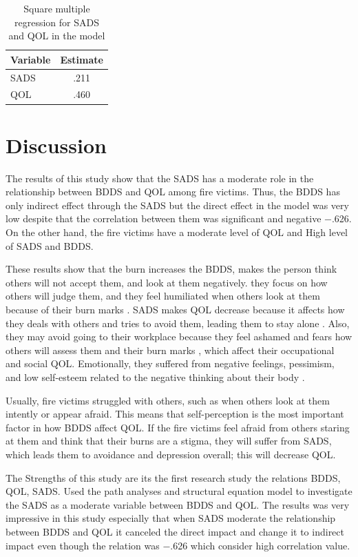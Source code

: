 \documentclass{NSP1}
\begin{document}
\begin{table}[!ht]
\centering
\caption{Square multiple regression for SADS and QOL in the model}
\label{tab:smr}
\begin{tabular}{lc}
\hline
Variable & Estimate \\
\hline
SADS & .211 \\
QOL  & .460 \\
\hline
\end{tabular}
\end{table}

\section{Discussion}
The results of this study show that the SADS has a moderate role in the relationship between BDDS and QOL among fire victims. Thus, the BDDS has only indirect effect through the SADS but the direct effect in the model was very low despite that the correlation between them was significant and negative $-$.626. On the other hand, the fire victims have a moderate level of QOL and High level of SADS and BDDS.

These results show that the burn increases the BDDS, makes the person think others will not accept them, and look at them negatively. they focus on how others will judge them, and they feel humiliated when others look at them because of their burn marks \cite{Suluhan2023}. SADS makes QOL decrease because it affects how they deals with others and tries to avoid them, leading them to stay alone \cite{Gorbani2021}. Also, they may avoid going to their workplace because they feel ashamed and fears how others will assess them and their burn marks \cite{Hussain2023}, which affect their occupational and social QOL. Emotionally, they suffered from negative feelings, pessimism, and low self-esteem related to the negative thinking about their body \cite{Yesilyurt2024}.

Usually, fire victims struggled with others, such as when others look at them intently or appear afraid. This means that self-perception is the most important factor in how BDDS affect QOL. If the fire victims feel afraid from others staring at them and think that their burns are a stigma, they will suffer from SADS, which leads them to avoidance and depression overall; this will decrease QOL.

The Strengths of this study are its the first research study the relations BDDS, QOL, SADS. Used the path analyses and structural equation model to investigate the SADS as a moderate variable between BDDS and QOL. The results was very impressive in this study especially that when SADS moderate the relationship between BDDS and QOL it canceled the direct impact and change it to indirect impact even though the relation was $-$.626 which consider high correlation value.
\end{document}
